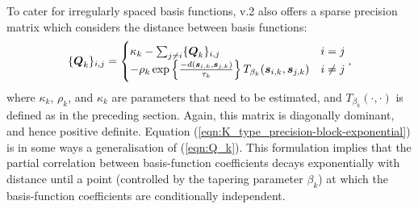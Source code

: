 \documentclass[nojss]{jss}
\def\mbf#1{{%
\mathchoice%
{\hbox{\boldmath$\displaystyle{#1}$}}%
{\hbox{\boldmath$\textstyle{#1}$}}%
{\hbox{\boldmath$\scriptstyle{#1}$}}%
{\hbox{\boldmath$\scriptscriptstyle{#1}$}}%
}}
\def\vec{\mbf}
\begin{document}
\begin{appendix}
 To cater for irregularly spaced basis functions,  v.2 also offers a sparse precision matrix which considers the distance between basis functions:  
\begin{equation}\label{eqn:K_type_precision-block-exponential}
\{\vec{Q}_{k}\}_{i, j}
=
\begin{cases}
\kappa_k -\sum_{j \neq i}\{\vec{Q}_{k}\}_{i, j}  & i = j\\
-\rho_k \exp \left\{\frac{-d(\vec{s}_{i, k}, \vec{s}_{j, k})}{\tau_k}\right\}
    T_{\beta_k}(\vec{s}_{i, k}, \vec{s}_{j, k})  & i \neq j\\
\end{cases},
\end{equation}
where $\kappa_k$, $\rho_k$, and $\kappa_k$ are parameters that need to be estimated, and $T_{\beta_k}(\cdot, \cdot)$ is defined as in the preceding section. 
 Again, this matrix is diagonally dominant, and hence positive definite. 
 Equation (\ref{eqn:K_type_precision-block-exponential}) is in some ways a generalisation of (\ref{eqn:Q_k}).
 This formulation implies that the partial correlation between basis-function coefficients decays exponentially with distance until a point (controlled by the tapering parameter $\beta_k$) at which the basis-function coefficients are conditionally independent. 








\end{appendix}
\end{document}
